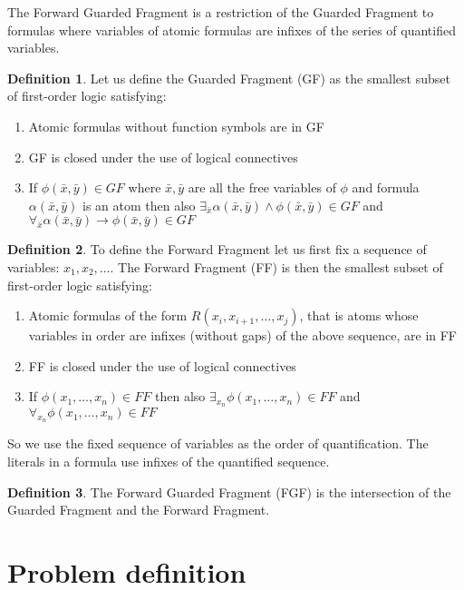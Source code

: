 \documentclass[english, shortabstract]{iithesis}
\theoremstyle{definition} \newtheorem{definition}{Definition}[chapter]
\theoremstyle{remark} \newtheorem{remark}[definition]{Observation}
\theoremstyle{plain} \newtheorem{theorem}[definition]{Theorem}
\theoremstyle{plain} \newtheorem{lemma}[definition]{Lemma}
\begin{document}
The Forward Guarded Fragment is a restriction of the Guarded Fragment to formulas where variables of atomic formulas are infixes of the series of quantified variables. 
\begin{definition}
Let us define the Guarded Fragment (GF) as the smallest subset of first-order logic satisfying:
\begin{enumerate}
    \item Atomic formulas without function symbols are in GF
    \item GF is closed under the use of logical connectives
    \item If $\phi(\bar{x}, \bar{y}) \in \mathit{GF}$ where $\bar{x}, \bar{y}$ are all the free variables of $\phi$ and formula $\alpha(\bar{x},\bar{y})$ is an atom
then also $\exists_{\bar{x}} \alpha(\bar{x}, \bar{y}) \land \phi(\bar{x}, \bar{y}) \in \mathit{GF}$ and $\forall_{\bar{x}} \alpha(\bar{x}, \bar{y}) \rightarrow \phi(\bar{x}, \bar{y}) \in \mathit{GF}$
\end{enumerate}
\end{definition}
\begin{definition}
To define the Forward Fragment let us first fix a sequence of variables: $x_1, x_2, \dots$. The Forward Fragment (FF) is then the smallest subset of first-order logic satisfying:
\begin{enumerate}
    \item Atomic formulas of the form $R(x_i, x_{i+1},\dots,x_{j})$, that is atoms whose variables in order are infixes (without gaps) of the above sequence, are in FF
    \item FF is closed under the use of logical connectives
    \item If $\phi(x_1,\dots, x_{n}) \in \mathit{FF}$ then also $\exists_{x_{n}} \phi(x_1,\dots, x_{n}) \in FF$ and $\forall_{x_n} \phi(x_1,\dots, x_{n}) \in \mathit{FF}$
\end{enumerate}
\end{definition}
So we use the fixed sequence of variables as the order of quantification. The literals in a formula use infixes of the quantified sequence.
\begin{definition}
The Forward Guarded Fragment (FGF) is the intersection of the Guarded Fragment and the Forward Fragment.
\end{definition}

\section{Problem definition}
\end{document}
